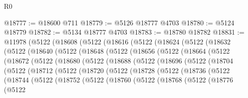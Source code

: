 \begin{lexlean}{R0}
\begin{coremodule}
@18777 := @18600 @711
@18779 := @5126 @18777 @4703
@18780 := @5124 @18779
@18782 := @5134 @18777 @4703
@18783 := @18780 @18782
@18831 := @11978
    (@5122
      (@18608
        (@5122
          (@18616
            (@5122
              (@18624
                (@5122
                  (@18632
                    (@5122
                      (@18640
                        (@5122
                          (@18648
                            (@5122
                              (@18656
                                (@5122
                                  (@18664
                                    (@5122
                                      (@18672
                                        (@5122
                                          (@18680
                                            (@5122
                                              (@18688
                                                (@5122
                                                  (@18696
                                                    (@5122
                                                      (@18704
                                                        (@5122
                                                          (@18712
                                                            (@5122
                                                              (@18720
                                                                (@5122
                                                                  (@18728
                                                                    (@5122
                                                                      (@18736
                                                                        (@5122
                                                                          (@18744
                                                                            (@5122
                                                                              (@18752
                                                                                (@5122
                                                                                  (@18760
                                                                                    (@5122
                                                                                      (@18768
                                                                                        (@5122
                                                                                          (@18776
                                                                                            (@5122

\end{coremodule}
\end{lexlean}
